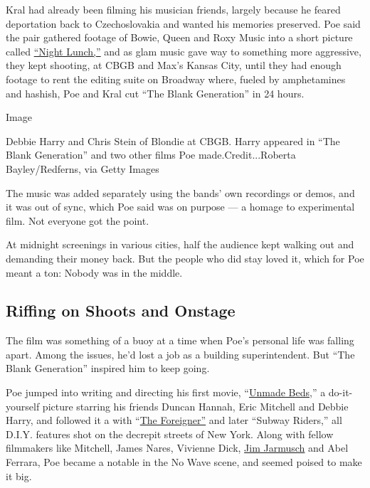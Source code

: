 Kral had already been filming his musician friends, largely because he
feared deportation back to Czechoslovakia and wanted his memories
preserved. Poe said the pair gathered footage of Bowie, Queen and Roxy
Music into a short picture called
\href{https://www.youtube.com/watch?v=Y9xF04Hvnoc}{``Night Lunch,''} and
as glam music gave way to something more aggressive, they kept shooting,
at CBGB and Max's Kansas City, until they had enough footage to rent the
editing suite on Broadway where, fueled by amphetamines and hashish, Poe
and Kral cut ``The Blank Generation'' in 24 hours.

Image

Debbie Harry and Chris Stein of Blondie at CBGB. Harry appeared in ``The
Blank Generation'' and two other films Poe made.Credit...Roberta
Bayley/Redferns, via Getty Images

The music was added separately using the bands' own recordings or demos,
and it was out of sync, which Poe said was on purpose --- a homage to
experimental film. Not everyone got the point.

At midnight screenings in various cities, half the audience kept walking
out and demanding their money back. But the people who did stay loved
it, which for Poe meant a ton: Nobody was in the middle.

\hypertarget{riffing-on-shoots-and-onstage}{%
\subsection{Riffing on Shoots and
Onstage}\label{riffing-on-shoots-and-onstage}}

The film was something of a buoy at a time when Poe's personal life was
falling apart. Among the issues, he'd lost a job as a building
superintendent. But ``The Blank Generation'' inspired him to keep going.

Poe jumped into writing and directing his first movie,
``\href{https://www.youtube.com/watch?v=vUlzGT7jNvo}{Unmade Beds,}'' a
do-it-yourself picture starring his friends Duncan Hannah, Eric Mitchell
and Debbie Harry, and followed it a with
``\href{https://www.youtube.com/watch?v=FFrn54j06IA}{The Foreigner''}
and later ``Subway Riders,'' all D.I.Y. features shot on the decrepit
streets of New York. Along with fellow filmmakers like Mitchell, James
Nares, Vivienne Dick,
\href{https://www.nytimes3xbfgragh.onion/2019/06/07/movies/the-dead-dont-die-cast.html}{Jim
Jarmusch} and Abel Ferrara, Poe became a notable in the No Wave scene,
and seemed poised to make it big.

